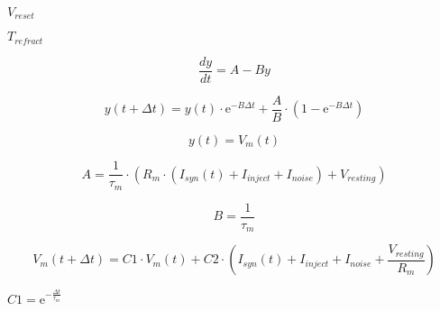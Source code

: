 \documentclass{article}
\begin{document}
$V_{reset}$
\pagebreak

$T_{refract}$
\pagebreak

\[
  \frac{d y}{dt} = A - By
 \]
\pagebreak

\[
  y(t+\Delta t) = y(t) \cdot \mathrm{e}^{-B \Delta t} + \frac{A}{B} \cdot (1 - \mathrm{e}^{-B \Delta t})
 \]
\pagebreak

\[
  y(t) = V_m(t)
 \]
\pagebreak

\[
  A = \frac{1}{\tau_m} \cdot (R_m \cdot (I_{syn}(t)+I_{inject}+I_{noise}) + V_{resting})
 \]
\pagebreak

\[
  B = \frac{1}{\tau_m}
 \]
\pagebreak

\[
  V_m(t+\Delta t) = C1 \cdot V_m(t) + 
  C2 \cdot (I_{syn}(t)+I_{inject}+I_{noise}+\frac{V_{resting}}{R_m}) 
 \]
\pagebreak

$C1 = \mathrm{e}^{-\frac{\Delta t}{\tau_m}}$
\pagebreak
\end{document}
